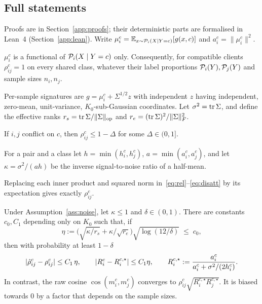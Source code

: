 \subsection{Full statements}\label{sec:theory}
Proofs are in Section~\ref{app:proofs}; their deterministic parts are formalised in Lean~4 (Section~\ref{app:lean}). Write $\mu_i^c=\mathbb{E}_{x\sim\mathcal{P}_i(X\mid Y=c)}[g(x,c)]$ and $a_i^c=\|\mu_i^c\|^2$.

\begin{proposition}[Invariance]\label{prop:inv}
$\mu_i^c$ is a functional of $\mathcal{P}_i(X\mid Y=c)$ only. Consequently, for compatible clients $\rho^c_{ij}=1$ on every shared class, whatever their label proportions $\mathcal{P}_i(Y),\mathcal{P}_j(Y)$ and sample sizes $n_i,n_j$.
\end{proposition}

\begin{assumption}[Noise]\label{ass:noise}
Per-sample signatures are $g=\mu_i^c+\Sigma^{1/2}z$ with independent $z$ having independent, zero-mean, unit-variance, $K_0$-sub-Gaussian coordinates. Let $\sigma^2=\operatorname{tr}\Sigma$, and define the effective ranks $r_s=\operatorname{tr}\Sigma/\|\Sigma\|_{\mathrm{op}}$ and $r_e=(\operatorname{tr}\Sigma)^2/\|\Sigma\|_F^2$.
\end{assumption}
\begin{assumption}[Identifiability]\label{ass:sep}
If $i,j$ conflict on $c$, then $\rho^c_{ij}\le1-\Delta$ for some $\Delta\in(0,1]$.
\end{assumption}
For a pair and a class let $h=\min(h_i^c,h_j^c)$, $a=\min(a_i^c,a_j^c)$, and let $\kappa=\sigma^2/(ah)$ be the inverse signal-to-noise ratio of a half-mean.

\begin{lemma}\label{lem:pop}
Replacing each inner product and squared norm in~\eqref{eq:rel}--\eqref{eq:disatt} by its expectation gives exactly $\rho_{ij}^c$.
\end{lemma}

\begin{theorem}[Concentration]\label{thm:conc}
Under Assumption~\ref{ass:noise}, let $\kappa\le1$ and $\delta\in(0,1)$. There are constants $c_0,C_1$ depending only on $K_0$ such that, if
\[
\eta:=\Big(\sqrt{\kappa/r_s}+\kappa/\sqrt{r_e}\Big)\sqrt{\log(12/\delta)}\;\le\; c_0,
\]
then with probability at least $1-\delta$
\[
|\hat\rho_{ij}^c-\rho_{ij}^c|\le C_1\,\eta,
\qquad
|R_i^c-R_i^{c,\star}|\le C_1\eta,
\qquad
R_i^{c,\star}:=\frac{a_i^c}{a_i^c+\sigma^2/(2h_i^c)}.
\]
In contrast, the raw cosine $\cos(m_i^c,m_j^c)$ converges to $\rho^c_{ij}\sqrt{R_i^{c,\star}R_j^{c,\star}}$. It is biased towards $0$ by a factor that depends on the sample sizes.
\end{theorem}


